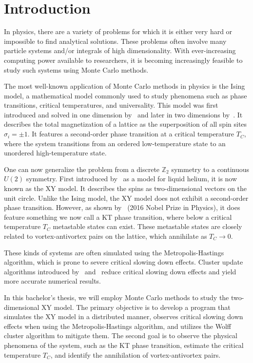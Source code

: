 \chapter{Introduction}\label{chap:introduction}
	In physics, there are a variety of problems for which it is either very hard or impossible to find analytical solutions. These problems often involve many particle systems and/or integrals of high dimensionality. With ever-increasing computing power available to researchers, it is becoming increasingly feasible to study such systems using Monte Carlo methods.
	
	The most well-known application of Monte Carlo methods in physics is the Ising model, a mathematical model commonly used to study phenomena such as phase transitions, critical temperatures, and universality. This model was first introduced and solved in one dimension by~\cite{ising} and later in two dimensions by~\cite{onsager}. It describes the total magnetization of a lattice as the superposition of all spin sites $\sigma_i = \pm 1$. It features a second-order phase transition at a critical temperature $T_C$, where the system transitions from an ordered low-temperature state to an unordered high-temperature state.
	
	One can now generalize the problem from a discrete $\mathbb{Z}_2$ symmetry to a continuous $U(2)$ symmetry. First introduced by~\cite{matsubara} as a model for liquid helium, it is now known as the XY model. It describes the spins as two-dimensional vectors on the unit circle. Unlike the Ising model, the XY model does not exhibit a second-order phase transition. However, as shown by~\cite{kosterlitz} (2016 Nobel Prize in Physics), it does feature something we now call a KT phase transition, where below a critical temperature $T_C$ metastable states can exist. These metastable states are closely related to vortex-antivortex pairs on the lattice, which annihilate as $T_C \rightarrow 0$.
	
	These kinds of systems are often simulated using the Metropolis-Hastings algorithm, which is prone to severe critical slowing down effects. Cluster update algorithms introduced by~\cite{sw} and~\cite{wolff} reduce critical slowing down effects and yield more accurate numerical results.
	
	In this bachelor's thesis, we will employ Monte Carlo methods to study the two-dimensional XY model. The primary objective is to develop a program that simulates the XY model in a distributed manner, observes critical slowing down effects when using the Metropolis-Hastings algorithm, and utilizes the Wolff cluster algorithm to mitigate them. The second goal is to observe the physical phenomena of the system, such as the KT phase transition, estimate the critical temperature $T_C$, and identify the annihilation of vortex-antivortex pairs.
	